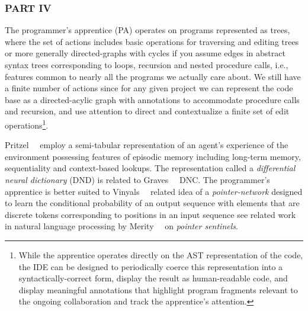 


\subsubsection*{PART IV}

The programmer's apprentice (PA) operates on programs represented as trees, where the set of actions includes basic operations for traversing and editing trees \emdash{} or more generally directed-graphs with cycles if you assume edges in abstract syntax trees corresponding to loops, recursion and nested procedure calls, i.e., features common to nearly all the programs we actually care about. We still have a finite number of actions since for any given project we can represent the code base as a directed-acylic graph with annotations to accommodate procedure calls and recursion, and use attention to direct and contextualize a finite set of edit operations\footnote{%
%
  While the apprentice operates directly on the AST representation of the code, the IDE can be designed to periodically coerce this representation into a syntactically-correct form, display the result as human-readable code, and display meaningful annotations that highlight program fragments relevant to the ongoing collaboration and track the apprentice's attention.}.

Pritzel~\etal{}~\cite{PritzeletalCoRR-17} employ a semi-tabular representation of an agent's experience of the environment possessing features of episodic memory including long-term memory, sequentiality and context-based lookups. The representation called a {\it{differential neural dictionary}} (DND) is related to Graves~\etal{}~\cite{GravesetalNATURE-16} DNC. The programmer's apprentice is better suited to Vinyals~\etal{}~\cite{VinyalsetalNIPS-15} related idea of a {\it{pointer-network}} designed to learn the conditional probability of an output sequence with elements that are discrete tokens corresponding to positions in an input sequence \emdash{} see related work in natural language processing by Merity~\etal{}~\cite{MerityetalCoRR-16} on {\it{pointer sentinels}}.


